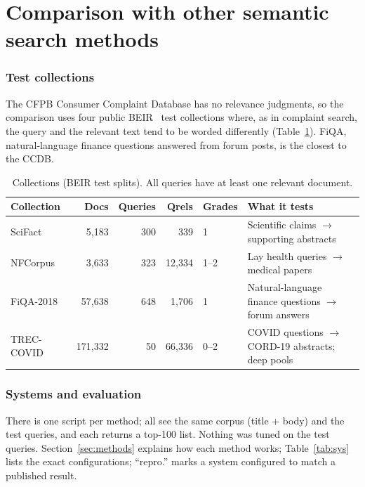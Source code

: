 \documentclass[11pt]{article}
\begin{document}
\part{Comparison with other semantic search methods}

\section{Test collections}\label{sec:data}
The CFPB Consumer Complaint Database has no relevance judgments, so the comparison uses four
public BEIR~\cite{thakur2021beir} test collections where, as in complaint search, the query and the
relevant text tend to be worded differently (Table~\ref{tab:data}). FiQA, natural-language finance
questions answered from forum posts, is the closest to the CCDB.

\begin{table}[H]\centering\small
\caption{Collections (BEIR test splits). All queries have at least one relevant document.}\label{tab:data}
\begin{tabularx}{\linewidth}{lrrrlX}\toprule
Collection & Docs & Queries & Qrels & Grades & What it tests\\\midrule
SciFact~\cite{wadden2020scifact} & 5,183 & 300 & 339 & 1 & Scientific claims $\to$ supporting abstracts\\
NFCorpus~\cite{boteva2016nfcorpus} & 3,633 & 323 & 12,334 & 1--2 & Lay health queries $\to$ medical papers\\
FiQA-2018~\cite{maia2018fiqa} & 57,638 & 648 & 1,706 & 1 & Natural-language finance questions $\to$ forum answers\\
TREC-COVID~\cite{voorhees2020treccovid} & 171,332 & 50 & 66,336 & 0--2 & COVID questions $\to$ CORD-19 abstracts; deep pools\\
\bottomrule\end{tabularx}
\end{table}



\section{Systems and evaluation}
There is one script per method; all see the same corpus (title + body) and the test queries, and
each returns a top-100 list. Nothing was tuned on the test queries. Section~\ref{sec:methods} explains how each method works; Table~\ref{tab:sys} lists the
exact configurations; ``repro.'' marks a system configured to match a published result.
\end{document}
